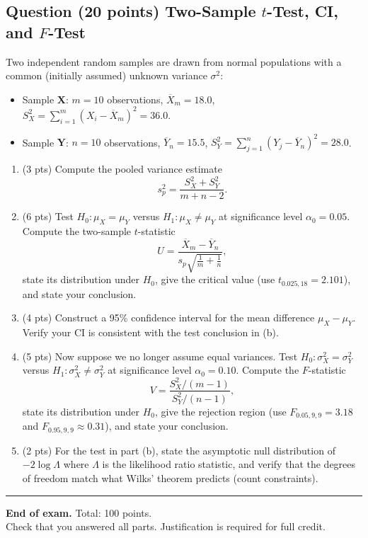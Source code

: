 \documentclass[11pt]{article}
\newcounter{qnum}
\newcommand{\question}[2]{\stepcounter{qnum}\subsection*{Question \theqnum \quad (#1 points) \hfill #2}}
\begin{document}
\question{20}{Two-Sample $t$-Test, CI, and $F$-Test}
Two independent random samples are drawn from normal populations with a common (initially assumed) unknown variance $\sigma^2$:

\begin{itemize}[leftmargin=2em,nosep]
    \item Sample $\mathbf{X}$: $m = 10$ observations, $\overline{X}_m = 18.0$, $S_X^2 = \sum_{i=1}^m (X_i - \overline{X}_m)^2 = 36.0$.
    \item Sample $\mathbf{Y}$: $n = 10$ observations, $\overline{Y}_n = 15.5$, $S_Y^2 = \sum_{j=1}^n (Y_j - \overline{Y}_n)^2 = 28.0$.
\end{itemize}

\begin{enumerate}[label=(\alph*),leftmargin=2em]
    \item (3 pts) Compute the pooled variance estimate
    \[ s_p^2 = \frac{S_X^2 + S_Y^2}{m + n - 2}. \]
    \item (6 pts) Test $H_0: \mu_X = \mu_Y$ versus $H_1: \mu_X \neq \mu_Y$ at significance level $\alpha_0 = 0.05$. Compute the two-sample $t$-statistic
    \[ U = \frac{\overline{X}_m - \overline{Y}_n}{s_p\sqrt{\tfrac{1}{m} + \tfrac{1}{n}}}, \]
    state its distribution under $H_0$, give the critical value (use $t_{0.025,18} = 2.101$), and state your conclusion.
    \item (4 pts) Construct a 95\% confidence interval for the mean difference $\mu_X - \mu_Y$. Verify your CI is consistent with the test conclusion in (b).
    \item (5 pts) Now suppose we no longer assume equal variances. Test $H_0: \sigma_X^2 = \sigma_Y^2$ versus $H_1: \sigma_X^2 \neq \sigma_Y^2$ at significance level $\alpha_0 = 0.10$. Compute the $F$-statistic
    \[ V = \frac{S_X^2/(m-1)}{S_Y^2/(n-1)}, \]
    state its distribution under $H_0$, give the rejection region (use $F_{0.05,9,9} = 3.18$ and $F_{0.95,9,9} \approx 0.31$), and state your conclusion.
    \item (2 pts) For the test in part (b), state the asymptotic null distribution of $-2\log\Lambda$ where $\Lambda$ is the likelihood ratio statistic, and verify that the degrees of freedom match what Wilks' theorem predicts (count constraints).
\end{enumerate}

\bigskip
\hrule
\bigskip

\begin{center}
\textbf{End of exam.} \quad Total: 100 points.\\
Check that you answered all parts. Justification is required for full credit.
\end{center}
\end{document}
